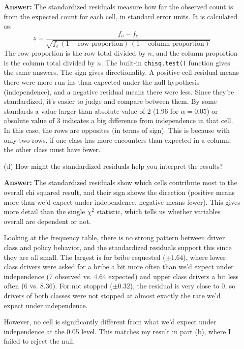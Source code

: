 \documentclass[12pt,letterpaper]{article}
\begin{document}
\begin{enumerate}
\begin{table}[h]
\begin{tabular}{l | c c c }
		\end{tabular}
	\end{table}
	\noindent \textbf{Answer:} The standardized residuals measure how far the observed count is from the expected count for each cell, in standard error units. It is calculated as: \[ z = \frac{f_o - f_e}{\sqrt{f_e \, (1 - \text{row proportion}) \, (1 - \text{column proportion})}} \] 
	The row proportion is the row total divided by $n$, and the column proportion is the column total divided by $n$. The built-in \texttt{chisq.test()} function gives the same answers. 
	\noindent The sign gives directionality. A positive cell residual means there were more run-ins than expected under the null hypothesis (independence), and a negative residual means there were less. Since they’re standardized, it’s easier to judge and compare between them. By some standards a value larger than absolute value of 2 (1.96 for $\alpha = 0.05$) or absolute value of 3 indicates a big difference from independence in that cell. \noindent In this case, the rows are opposites (in terms of sign). This is because with only two rows, if one class has more encounters than expected in a column, the other class must have fewer.
	
	\item [(d)] How might the standardized residuals help you interpret the results?  
	
	\noindent \textbf{Answer:} The standardized residuals show which cells contribute most to the overall chi squared result, and their sign shows the direction (positive means more than we'd expect under independence, negative means fewer). This gives more detail than the single $\chi^2$ statistic, which tells us whether variables overall are dependent or not.
	
	\noindent Looking at the frequency table, there is no strong pattern between driver class and policy behavior, and the standardized residuals support this since they are all small. The largest is for bribe requested ($\pm 1.64$), where lower class drivers were asked for a bribe a bit more often than we'd expect under independence (7 observed vs. 4.64 expected) and upper class drivers a bit less often (6 vs. 8.36). For not stopped ($\pm 0.32$), the residual is very close to 0, so drivers of both classes were not stopped at almost exactly the rate we'd expect under independence. 
	
	\noindent However, no cell is significantly different from what we'd expect under independence at the 0.05 level. This matches my result in part (b), where I failed to reject the null.  
\end{enumerate}
\newpage
\end{document}

